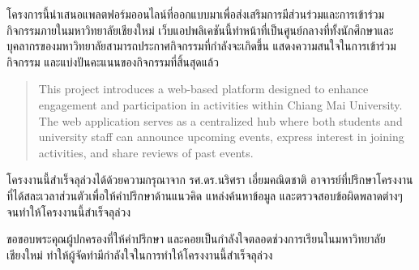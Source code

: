 \maketitle
\makesignature

\ifproject
\begin{abstractTH}

โครงการนี้นำเสนอแพลตฟอร์มออนไลน์ที่ออกแบบมาเพื่อส่งเสริมการมีส่วนร่วมและการเข้าร่วมกิจกรรมภายในมหาวิทยาลัยเชียงใหม่ 
เว็บแอปพลิเคชันนี้ทำหน้าที่เป็นศูนย์กลางที่ทั้งนักศึกษาและบุคลากรของมหาวิทยาลัยสามารถประกาศกิจกรรมที่กำลังจะเกิดขึ้น 
แสดงความสนใจในการเข้าร่วมกิจกรรม และแบ่งปันคะแนนของกิจกรรมที่สิ้นสุดแล้ว

\end{abstractTH}

\begin{abstract}

This project introduces a web-based platform designed to enhance engagement and participation in activities within Chiang Mai University.
The web application serves as a centralized hub where both students and university staff can announce upcoming events, express interest in joining activities, and share reviews of past events.
\end{abstract}

\iffalse
\begin{dedication}
This document is dedicated to all Chiang Mai University students.

Dedication page is optional.
\end{dedication}
\fi %

\begin{acknowledgments}
\hspace{\parindent} โครงงานนี้สำเร็จลุล่วงได้ด้วยความกรุณาจาก รศ.ดร.นริศรา เอี่ยมคณิตชาติ อาจารย์ที่ปรึกษาโครงงาน
ที่ได้สละเวลาส่วนตัวเพื่อให้คำปรึกษาด้านแนวคิด แหล่งค้นหาข้อมูล และตรวจสอบข้อผิดพลาดต่างๆ จนทำให้โครงงานนี้สำเร็จลุล่วง\par
ขอขอบพระคุณผู้ปกครองที่ให้คำปรึกษา และคอยเป็นกำลังใจตลอดช่วงการเรียนในมหาวิทยาลัยเชียงใหม่ ทำให้ผู้จัดทำมีกำลังใจในการทำให้โครงงานนี้สำเร็จลุล่วง
\end{acknowledgments}%
\fi %

\contentspage

\ifproject
\figurelistpage

\tablelistpage
\fi %



